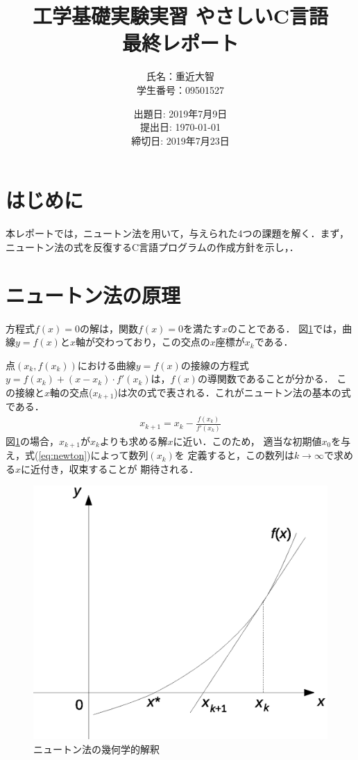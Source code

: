 \documentclass[12pt]{jarticle}
\renewcommand  \[  {\begin{eqnarray}}
\renewcommand  \]  {\end{eqnarray}}
\begin{document}
\title{工学基礎実験実習 やさしいC言語\\最終レポート}%
\date{出題日: 2019年7月9日 \\
      提出日: \today \\
      締切日: 2019年7月23日 \\} 
\author{氏名：重近大智\\学生番号：09501527}
\maketitle

\section{はじめに}
本レポートでは，ニュートン法を用いて，与えられた4つの課題を解く．まず，ニュートン法の式を反復するC言語プログラムの作成方針を示し，．

\section{ニュートン法の原理}
\label{sec:bas}

方程式$f(x)=0$の解は，関数$f(x)=0$を満たす$x$のことである．
図\ref{fig:newton-kaishaku}では，曲線$y=f(x)$と$x$軸が交わっており，この交点の$x$座標が$x_k$である．

点$(x_k,f(x_k))$における曲線$y=f(x)$の接線の方程式$y=f(x_k)+(x-x_k)\cdot f\prime(x_k)$は，$f(x)$の導関数であることが分かる．
この接線と$x$軸の交点($x_{k+1}$)は次の式で表される\cite{clo05,mathwld}．これがニュートン法の基本の式である．
\[
x_{k+1}=x_k-\frac{f(x_k)}{f'(x_k)}
\label{eq:newton}
\]
図\ref{fig:newton-kaishaku}の場合，$x_{k+1}$が$x_k$よりも求める解$x$に近い．このため，
適当な初期値$x_0$を与え，式(\ref{eq:newton})によって数列$(x_k)$を
定義すると，この数列は$k\rightarrow\infty$で求める$x$に近付き，収束することが
期待される．

\begin{figure}[t]
  \center
  \includegraphics[scale=.6]{newton-kaishaku.eps}
  \caption{ニュートン法の幾何学的解釈}
  \label{fig:newton-kaishaku}
\end{figure}
\end{document}
